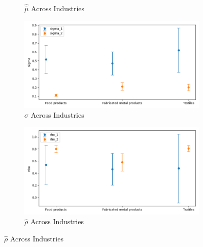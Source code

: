 \documentclass{article}
\begin{document}
\begin{figure}[ht!]
\begin{subfigure}[t]{0.32\textwidth}
        \caption{$\hat{\bar\mu}$ Across Industries}
    \end{subfigure}
    \begin{subfigure}[t]{0.32\textwidth}
        \centering
        \includegraphics[width=\textwidth]{figure/ar1_mixture_sigma_across_industries.png}
        \caption{$\hat\sigma$ Across Industries}
    \end{subfigure}
    \begin{subfigure}[t]{0.32\textwidth}
        \centering
        \includegraphics[width=\textwidth]{figure/ar1_mixture_rho_across_industries.png}
        \caption{$\hat\rho$ Across Industries}
    \end{subfigure}
\end{figure}
\end{document}
